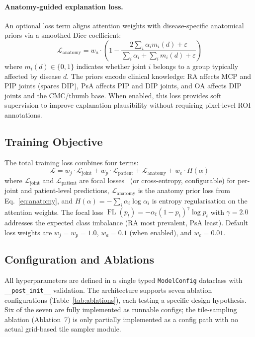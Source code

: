 \documentclass{article}
\begin{document}
\paragraph{Anatomy-guided explanation loss.} An optional loss term aligns attention weights with disease-specific anatomical priors via a smoothed Dice coefficient:
\begin{equation}
\mathcal{L}_{\text{anatomy}} = w_a \cdot \left(1 - \frac{2\sum_i \alpha_i m_i(d) + \varepsilon}{\sum_i \alpha_i + \sum_i m_i(d) + \varepsilon}\right)
\label{eq:anatomy}
\end{equation}
where $m_i(d) \in \{0,1\}$ indicates whether joint $i$ belongs to a group typically affected by disease $d$. The priors encode clinical knowledge: RA affects MCP and PIP joints (spares DIP), PsA affects PIP and DIP joints, and OA affects DIP joints and the CMC/thumb base. When enabled, this loss provides soft supervision to improve explanation plausibility without requiring pixel-level ROI annotations.

\subsection{Training Objective}

The total training loss combines four terms:
\begin{equation}
\mathcal{L} = w_j \cdot \mathcal{L}_{\text{joint}} + w_p \cdot \mathcal{L}_{\text{patient}} + \mathcal{L}_{\text{anatomy}} + w_e \cdot H(\alpha)
\label{eq:loss}
\end{equation}
where $\mathcal{L}_{\text{joint}}$ and $\mathcal{L}_{\text{patient}}$ are focal losses~\cite{focalloss2017} (or cross-entropy, configurable) for per-joint and patient-level predictions, $\mathcal{L}_{\text{anatomy}}$ is the anatomy prior loss from Eq.~\ref{eq:anatomy}, and $H(\alpha) = -\sum_i \alpha_i \log \alpha_i$ is entropy regularisation on the attention weights. The focal loss $\operatorname{FL}(p_t) = -\alpha_t (1-p_t)^\gamma \log p_t$ with $\gamma=2.0$ addresses the expected class imbalance (RA most prevalent, PsA least). Default loss weights are $w_j = w_p = 1.0$, $w_a = 0.1$ (when enabled), and $w_e = 0.01$.

\subsection{Configuration and Ablations}

All hyperparameters are defined in a single typed \texttt{ModelConfig} dataclass with \texttt{\_\_post\_init\_\_} validation. The architecture supports seven ablation configurations (Table~\ref{tab:ablations}), each testing a specific design hypothesis. Six of the seven are fully implemented as runnable configs; the tile-sampling ablation (Ablation~7) is only partially implemented as a config path with no actual grid-based tile sampler module.
\end{document}
